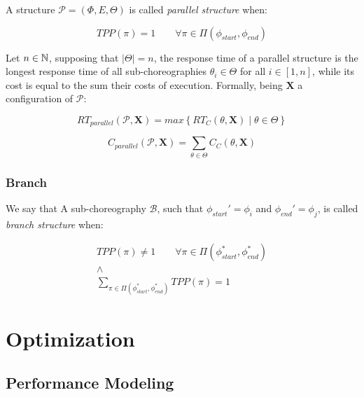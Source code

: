 A structure $\mathcal{P} = (\Phi,E,\Theta)$ is called \textit{parallel structure} when:

\begin{equation}
	TPP(\pi) = 1 \qquad \forall \pi \in \Pi(\phi_{start}, \phi_{end})
\end{equation}

Let $n \in \mathbb{N}$, supposing that $|\Theta| = n$, the response time of a parallel structure is the longest response time of all sub-choreographies $\theta_i \in \Theta$ for all $i \in \left[ 1, n \right]$, while its cost is equal to the sum their costs of execution. Formally, being $\textbf{X}$ a configuration of  $\mathcal{P}$:

\begin{equation}
	RT_{parallel}(\mathcal{P}, \textbf{X}) = max \left\lbrace RT_C(\mathcal{\theta}, \textbf{X}) \mid \theta \in \Theta \right\rbrace 
\end{equation}

\begin{equation}
	C_{parallel}(\mathcal{P}, \textbf{X}) = \sum_{\theta \in \Theta} C_C(\theta, \textbf{X})
\end{equation}



\subsubsection{Branch}

We say that A sub-choreography $\mathcal{B}$, such that $\phi_{start}' = \phi_i$ and $\phi_{end}' = \phi_j$, is called \textit{branch structure} when:

\begin{equation}
	\begin{array}{c}
	TPP(\pi) \neq 1 \qquad \forall \pi \in \Pi(\phi_{start}^*, \phi_{end}^*) \\
	\wedge \\
	\displaystyle\sum_{\pi \in \Pi(\phi_{start}^*, \phi_{end}^*)} TPP(\pi) = 1
	\end{array}
\end{equation}


\section{Optimization}


\subsection{Performance Modeling}






